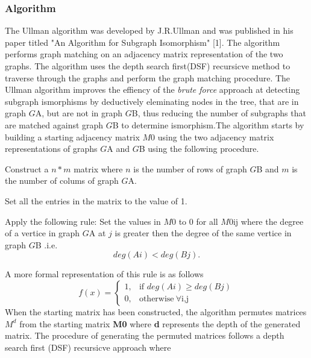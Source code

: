 \subsubsection{Algorithm}
The Ullman algorithm was developed by J.R.Ullman and was published in his paper titled "An Algorithm for Subgraph Isomorphism" [1]. 
The algorithm performs graph matching on an adjacency matrix representation of the two graphs. The algorithm uses the depth search first(DSF) recursicve
method to traverse through the graphs and perform the graph matching procedure. The Ullman algorithm improves the effiency of the \textit{brute force} approach at 
detecting subgraph ismorphisms by deductively eleminating nodes in the tree, that are in graph $G${\tiny A}, but are not in graph $G${\tiny B}, 
thus reducing the number of subgraphs that are matched against graph $G${\tiny B} to determine ismorphism.\newline\newline The algorithm starts 
by building a starting adjacency matrix $M0$ using the two adjacency matrix representations of graphs $G${\tiny A} and $G${\tiny B} using the 
following procedure.
\begin{myEnumerate}
\item Construct a $n * m$ matrix where $n$ is the number of rows of graph $G${\tiny B} and $m$ is the number of colums of graph $G${\tiny A}.
\item Set all the entries in the matrix to the value of 1.
\item Apply the following rule:
	Set the values in $M0$ to 0 for all $M0${\tiny ij} where the degree of a vertice in graph $G${\tiny A} at $j$ is greater then the degree of the same vertice in graph $G${\tiny B} .i.e. 
	\begin{equation}
		deg(Ai) < deg(Bj). 
	\end{equation}

\end{myEnumerate}
	A more formal representation of this rule is as follows
	\[
			f(x)= 
			\begin{cases}
				1,& \text{if } deg(Ai)\geq deg(Bj)\\ 
				0,              & \text{otherwise}\   \forall \text{i,j}
			\end{cases}
	\]
When the starting matrix has been constructed, the algorithm permutes matrices $M^d$ from the starting matrix \textbf{M0} where \textbf{d} 
represents the depth of the generated matrix. The procedure of generating the permuted matrices follows a depth search first (DSF) recursicve approach where 
